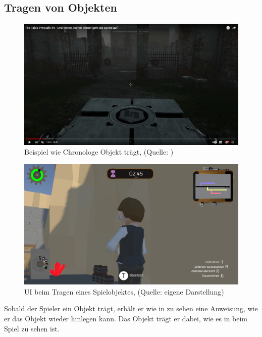 \subsection{Tragen von Objekten}\label{sec:carry-objects}

\begin{figure}[ht]
\centering
\includegraphics[width=1\linewidth]{content/pictures/ObjectInArm.jpg}
\caption{Beispiel wie Chronologe Objekt trägt, (Quelle: \cite{gametube_talos_2014})}
\label{fig:carry_object_objectarm}
\end{figure}

\begin{figure}[ht]
\centering
\includegraphics[width=1\linewidth]{content/pictures/CarryObjects.jpg}
\caption{UI beim Tragen eines Spielobjektes, (Quelle: eigene Darstellung)}
\label{fig:carry_object_ui}
\end{figure}

Sobald der Spieler ein Objekt trägt, erhält er wie in  zu sehen eine Anweisung, wie er das Objekt wieder hinlegen kann. Das Objekt trägt er dabei, wie es in  beim Spiel  zu sehen ist.
